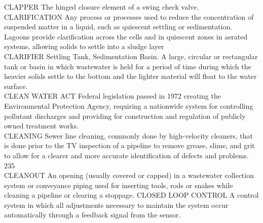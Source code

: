 CLAPPER
The hinged closure element of a swing check valve.
\vspace{0.3cm}\\
CLARIFICATION
Any process or processes used to reduce the concentration of suspended matter in a liquid, such as quiescent settling or sedimentation. Lagoons provide clarification across the cells and in quiescent zones in aerated systems, allowing solids to settle into a sludge layer
\vspace{0.3cm}\\
CLARIFIER
Settling Tank, Sedimentation Basin. A large, circular or rectangular tank or basin in which wastewater is held for a period of time during which the heavier solids settle to the bottom and the lighter material will float to the water surface.
\vspace{0.3cm}\\
CLEAN WATER ACT
Federal legislation passed in 1972 creating the Environmental Protection Agency, requiring a nationwide system for controlling pollutant discharges and providing for construction and regulation of publicly owned treatment works.
\vspace{0.3cm}\\
CLEANING
Sewer line cleaning, commonly done by high-velocity cleaners, that is done prior to the TV inspection of a pipeline to remove grease, slime, and grit to allow for a clearer and more accurate identification of defects and problems. 235 
\vspace{0.3cm}\\
CLEANOUT
An opening (usually covered or capped) in a wastewater collection system or conveyance piping used for inserting tools, rods or snakes while cleaning a pipeline or clearing a stoppage. 
CLOSED LOOP CONTROL
A control system in which all adjustments necessary to maintain the system occur automatically through a feedback signal from the sensor.
\vspace{0.3cm}\\

